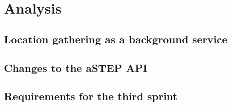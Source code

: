 \section{Analysis}

\subsection{Location gathering as a background service} \label{ssec:LocationGatherBGS}

\subsection{Changes to the aSTEP API}


\subsection{Requirements for the third sprint}
